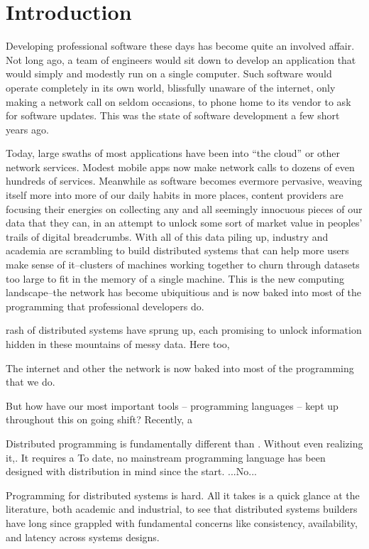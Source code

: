 \chapter{Introduction}

Developing professional software these days has become quite an involved affair.
Not long ago, a team of engineers would sit down to develop an application that
would simply and modestly run on a single computer. Such software would operate
completely in its own world, blissfully unaware of the internet, only making a
network call on seldom occasions, \eg to phone home to its vendor to ask for
software updates. This was the state of software development a few short years
ago.


Today, large swaths of most applications have been into ``the cloud'' or other
network services. Modest mobile apps now make network calls to dozens of even
hundreds of services. Meanwhile as software becomes evermore pervasive, weaving
itself more into more of our daily habits in more places, content providers are
focusing their energies on collecting any and all seemingly innocuous pieces of
our data that they can, in an attempt to unlock some sort of market value in
peoples' trails of digital breadcrumbs. With all of this data piling up,
industry and academia are scrambling to build distributed systems that can help
more users make sense of it--clusters of machines working together to churn
through datasets too large to fit in the memory of a single machine. This is the
new computing landscape--the network has become ubiquitious and is now baked
into most of the programming that professional developers do.

 rash of distributed systems have
sprung up, each promising to unlock information hidden in these mountains of
messy data. Here too,

The internet and other the network is
now baked into most of the programming that we do.

But how have our most important tools -- programming languages -- kept up
throughout this on going shift? Recently, a

Distributed programming is fundamentally different than . Without even realizing
it,. It requires a
To date, no mainstream programming language has been designed with distribution in mind since the start. ...No...

Programming for distributed systems is hard. All it takes is a quick glance at
the literature, both academic and industrial, to see that distributed systems
builders have long since grappled with fundamental concerns like consistency,
availability, and latency across systems designs.

